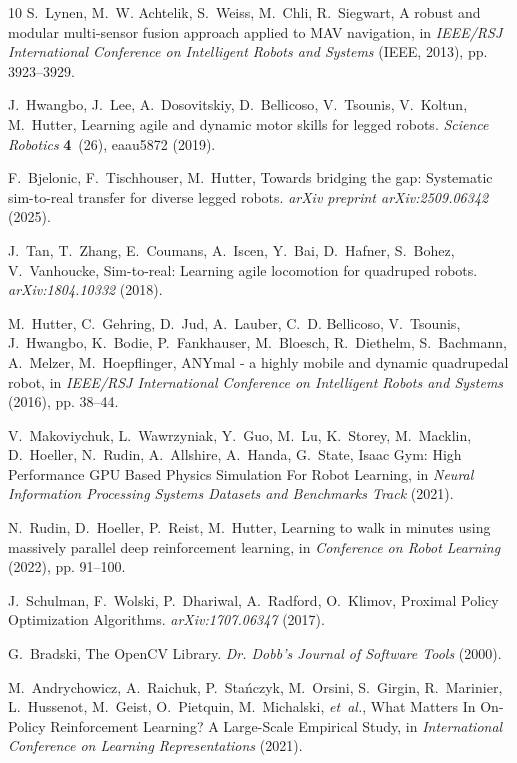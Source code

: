 \documentclass[9pt,twocolumn,twoside]{osajnl}
\begin{document}
\begin{thebibliography}{10}
    S.~{Lynen}, M.~W. {Achtelik}, S.~{Weiss}, M.~{Chli}, R.~{Siegwart}, A robust
      and modular multi-sensor fusion approach applied to MAV navigation, in
      \emph{IEEE/RSJ International Conference on Intelligent Robots and Systems}
      (IEEE, 2013), pp. 3923--3929.
    
    J.~{Hwangbo}, J.~{Lee}, A.~{Dosovitskiy}, D.~{Bellicoso}, V.~{Tsounis},
      V.~{Koltun}, M.~{Hutter}, Learning agile and dynamic motor skills for legged
      robots. \emph{Science Robotics} \textbf{4}~(26), eaau5872 (2019).
    
    F.~{Bjelonic}, F.~{Tischhouser}, M.~{Hutter}, Towards bridging the gap:
      Systematic sim-to-real transfer for diverse legged robots. \emph{arXiv
      preprint arXiv:2509.06342} (2025).
    
    J.~{Tan}, T.~{Zhang}, E.~{Coumans}, A.~{Iscen}, Y.~{Bai}, D.~{Hafner},
      S.~{Bohez}, V.~{Vanhoucke}, Sim-to-real: Learning agile locomotion for
      quadruped robots. \emph{arXiv:1804.10332}  (2018).
    
    M.~{Hutter}, C.~{Gehring}, D.~{Jud}, A.~{Lauber}, C.~D. {Bellicoso},
      V.~{Tsounis}, J.~{Hwangbo}, K.~{Bodie}, P.~{Fankhauser}, M.~{Bloesch},
      R.~{Diethelm}, S.~{Bachmann}, A.~{Melzer}, M.~{Hoepflinger}, ANYmal - a
      highly mobile and dynamic quadrupedal robot, in \emph{IEEE/RSJ International
      Conference on Intelligent Robots and Systems} (2016), pp. 38--44.
    
    V.~{Makoviychuk}, L.~{Wawrzyniak}, Y.~{Guo}, M.~{Lu}, K.~{Storey},
      M.~{Macklin}, D.~{Hoeller}, N.~{Rudin}, A.~{Allshire}, A.~{Handa},
      G.~{State}, Isaac Gym: High Performance {GPU} Based Physics Simulation For
      Robot Learning, in \emph{Neural Information Processing Systems Datasets and
      Benchmarks Track} (2021).
    
    N.~{Rudin}, D.~{Hoeller}, P.~{Reist}, M.~{Hutter}, Learning to walk in minutes
      using massively parallel deep reinforcement learning, in \emph{Conference on
      Robot Learning} (2022), pp. 91--100.
    
    J.~{Schulman}, F.~{Wolski}, P.~{Dhariwal}, A.~{Radford}, O.~{Klimov}, Proximal
      Policy Optimization Algorithms. \emph{arXiv:1707.06347}  (2017).
    
    G.~{Bradski}, {The OpenCV Library}. \emph{Dr. Dobb's Journal of Software Tools}
       (2000).
    
    M.~{Andrychowicz}, A.~{Raichuk}, P.~{Sta{\'n}czyk}, M.~{Orsini}, S.~{Girgin},
      R.~{Marinier}, L.~{Hussenot}, M.~{Geist}, O.~{Pietquin}, M.~{Michalski},
      \emph{et~al.}, What Matters In On-Policy Reinforcement Learning? A
      Large-Scale Empirical Study, in \emph{International Conference on Learning
      Representations} (2021).
    
    \end{thebibliography}
\end{document}

